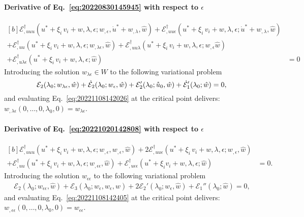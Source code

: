 \documentclass[12pt, final]{scrartcl}
\theoremstyle{definition}
\newcommand{\E}{\mathcal E}
\newcommand{\EE}{\mathcal E ^ \dagger}
\begin{document}
\paragraph{Derivative of Eq.~\eqref{eq:20220830145945} with respect to \(\epsilon\)}
\begin{equation}
  \label{eq:20221108142026}
  \begin{aligned}[b]
    \EE_{,uuu}(u^\ast + \xi_i \, v_i + w, \lambda, \epsilon; w_{,\epsilon}, \dot{u}^\ast + w_{,\lambda}, \hat{w}) + \EE_{,uu\epsilon}(u^\ast + \xi_i \, v_i + w, \lambda, \epsilon; \dot{u}^\ast + w_{,\lambda}, \hat{w}) &\\
    + \EE_{,uu}(u^\ast + \xi_i \, v_i + w, \lambda, \epsilon; w_{,\lambda\epsilon}, \hat{w}) + \EE_{,uu\lambda}(u^\ast + \xi_i \, v_i + w, \lambda, \epsilon; w_{,\epsilon}\hat{w})&\\
    + \EE_{,u\lambda\epsilon}(u^\ast + \xi_i \, v_i + w, \lambda, \epsilon; \hat{w}) &= 0
  \end{aligned}
\end{equation}
Introducing the solution \(w_{\lambda\epsilon} \in W\) to the following variational problem
\begin{equation}
  \label{eq:20221030180909}
  \E_2(\lambda_0; w_{\lambda\epsilon}, \hat{w}) + \dot{\E}_2(\lambda_0; w_\epsilon, \hat{w})  + \E_2'(\lambda_0; \mathring{u}_0, \hat{w}) + \dot{\E}_1'(\lambda_0; \hat{w}) = 0,\\
\end{equation}
and evaluating Eq.~\eqref{eq:20221108142026} at the critical point delivers: \(w_{,\lambda\epsilon}(0, \ldots, 0, \lambda_0, 0) = w_{\lambda\epsilon}\).

\paragraph{Derivative of Eq.~\eqref{eq:20221020142808} with respect to \(\epsilon\)}
\begin{equation}
  \label{eq:20221108142405}
  \begin{aligned}[b]
    \EE_{,uuu}(u^\ast + \xi_i \, v_i + w, \lambda, \epsilon; w_{,\epsilon}, w_{,\epsilon}, \hat{w}) + 2\EE_{,uu\epsilon}(u^\ast + \xi_i \, v_i + w, \lambda, \epsilon; w_{,\epsilon}, \hat{w}) &\\
    + \EE_{,uu}(u^\ast + \xi_i \, v_i + w, \lambda, \epsilon; w_{,\epsilon\epsilon}, \hat{w}) + \EE_{,u\epsilon\epsilon}(u^\ast + \xi_i v_i + w, \lambda, \epsilon; \hat{w}) &= 0.
  \end{aligned}
\end{equation}
Introducing the solution \(w_{\epsilon\epsilon}\) to the following variational problem
\begin{gather}
  \label{eq:20221030181711}
  \E_2(\lambda_0; w_{\epsilon\epsilon}, \hat{w}) + \E_3(\lambda_0; w_\epsilon, w_\epsilon, \hat{w}) + 2\E_2'(\lambda_0; w_\epsilon, \hat{w}) + \E_1''(\lambda_0; \hat{w}) = 0,
\end{gather}
and evaluating Eq.~\eqref{eq:20221108142405} at the critical point delivers: \(w_{,\epsilon\epsilon}(0, \ldots, 0, \lambda_0, 0) = w_{\epsilon\epsilon}\).
\end{document}
